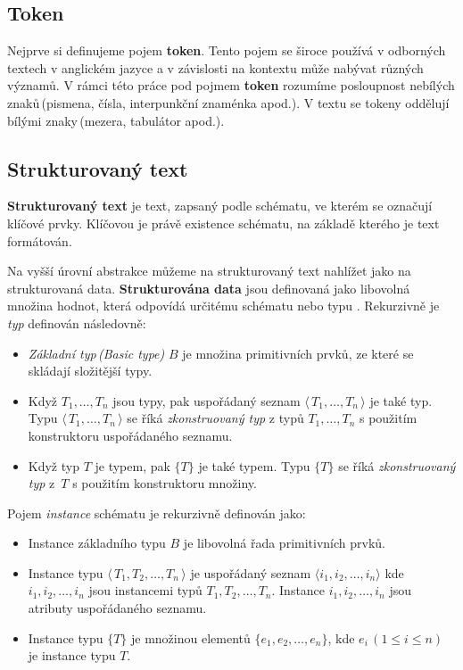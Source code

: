 \subsection*{Token}

Nejprve si definujeme pojem \textbf{token}. Tento pojem se široce používá v odborných textech v anglickém jazyce a v závislosti na kontextu může nabývat různých významů. V rámci této práce pod pojmem \textbf{token} rozumíme posloupnost nebílých znaků\,(pismena, čísla, interpunkční znaménka apod.). V textu se tokeny oddělují bílými znaky\,(mezera, tabulátor apod.).    

\subsection*{Strukturovaný text}
\label{structuredText}
\textbf{Strukturovaný text} je text, zapsaný podle schématu, ve kterém se označují klíčové prvky. Klíčovou je právě existence schématu, na základě kterého je text formátován.

 Na vyšší úrovní abstrakce můžeme na strukturovaný text nahlížet jako na strukturovaná data.  \textbf{Strukturována data} jsou definovaná jako libovolná množina hodnot, která odpovídá určitému schématu nebo typu \cite{Arasu:2003:ESD:872757.872799}. Rekurzivně je \emph{typ} definován následovně:
\begin{itemize}
\item \emph{Základní typ\,(Basic type)} $B$ je množina primitivních prvků, ze které se skládají složitější typy.

\item Když $T_1, \ldots, T_n$ jsou typy, pak uspořádaný seznam $\langle\,T_1, \ldots, T_n\,\rangle$ je také typ. Typu $\langle\,T_1, \ldots, T_n\,\rangle$ se říká \emph{zkonstruovaný typ} z typů $T_1, \ldots, T_n$ s použitím konstruktoru uspořádaného seznamu.

\item Když typ $T$ je typem, pak $\{T\}$ je také typem. Typu $\{T\}$ se říká  \emph{zkonstruovaný typ} z~$T$ s použitím konstruktoru množiny. 
\end{itemize}
Pojem \emph{instance} schématu je rekurzivně definován jako:
\begin{itemize}
\item Instance základního typu $B$ je libovolná řada primitivních prvků.

\item Instance typu  $\langle\,T_1, T_2, \ldots, T_n\,\rangle$ je uspořádaný seznam $\langle i_1, i_2, \ldots, i_n \rangle$ kde $i_1, i_2, \ldots, i_n $ jsou instancemi typů $T_1, T_2, \ldots, T_n$. Instance $i_1, i_2, \ldots, i_n$ jsou atributy uspořádaného seznamu.

\item Instance typu $\{T\}$ je množinou elementů $\{e_1, e_2, \ldots, e_n\}$, kde $e_i\,\left(1 \leq i \leq n\right)$ je instance typu $T$. 
\end{itemize}

